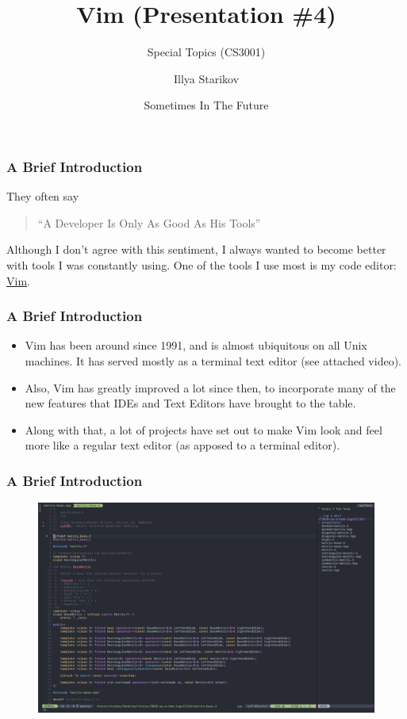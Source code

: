 \documentclass[xclolor=dvipsnames]{beamer}            %
\title{Vim (Presentation \#4)}
\subtitle{Special Topics (CS3001)}
\author{Illya Starikov}
\date{Sometimes In The Future}
\institute{Missouri University of Science and Technology}
\begin{document}
\begin{darkframes}
    \maketitle

    \begin{frame}
        \frametitle{A Brief Introduction}

        They often say

        \begin{quote}
            ``A Developer Is Only As Good As His Tools''
        \end{quote}

        Although I don't agree with this sentiment, I always wanted to become better with tools I was constantly using. One of the tools I use most is my code editor: \href{https://www.vim.org}{Vim}.

    \end{frame}

    \begin{frame}
        \frametitle{A Brief Introduction}

        \begin{itemize}
            \item Vim has been around since 1991, and is almost ubiquitous on all Unix machines. It has served mostly as a terminal text editor (see attached video).
            \item Also, Vim has greatly improved a lot since then, to incorporate many of the new features that IDEs and Text Editors have brought to the table.
            \item Along with that, a lot of projects have set out to make Vim look and feel more like a regular text editor (as apposed to a terminal editor).
        \end{itemize}
    \end{frame}

    \begin{frame}[fragile]
        \frametitle{A Brief Introduction}
        \begin{figure}[H]
            \centering
            \includegraphics[width=\linewidth,cfbox=white 1pt 1pt]{assets/vim.png}
            \label{fig:vim}
        \end{figure}
    \end{frame}



\end{darkframes}
\end{document}
